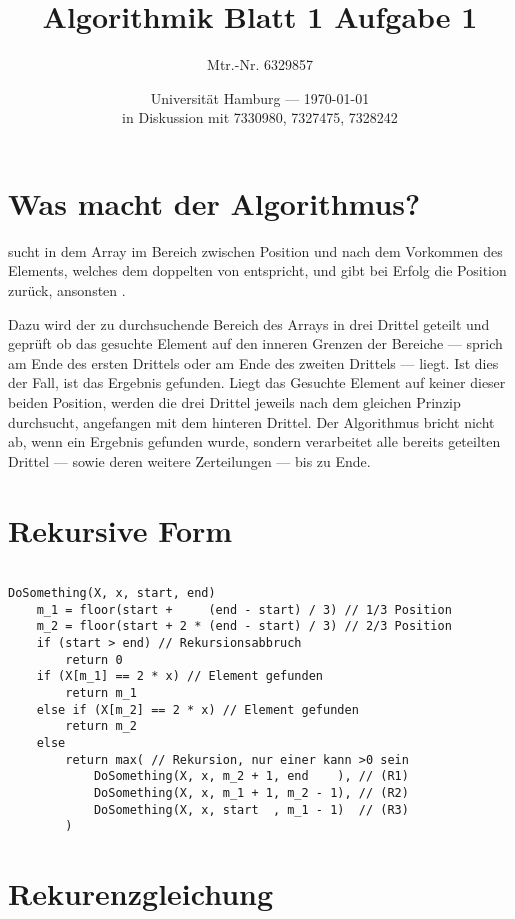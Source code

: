 \documentclass[parskip=half,a4paper]{scrartcl}
\title{Algorithmik Blatt 1 Aufgabe 1}
\author{Mtr.-Nr. 6329857}
\date{Universität Hamburg --- \today \\ in Diskussion mit 7330980, 7327475, 7328242}
\begin{document}
\maketitle %

\section*{Was macht der Algorithmus?}

 sucht in dem Array  im Bereich zwischen Position
 und  nach dem Vorkommen des Elements, welches dem doppelten von 
entspricht, und gibt bei Erfolg die Position zurück, ansonsten .

Dazu wird der zu durchsuchende Bereich des Arrays in drei Drittel geteilt und geprüft ob das gesuchte Element auf den inneren Grenzen der Bereiche --- sprich am Ende des ersten Drittels oder am Ende des zweiten Drittels --- liegt. Ist dies der Fall, ist das Ergebnis gefunden. Liegt das Gesuchte Element auf keiner dieser beiden Position, werden die drei Drittel jeweils nach dem gleichen Prinzip durchsucht, angefangen mit dem hinteren Drittel. Der Algorithmus bricht nicht ab, wenn ein Ergebnis gefunden wurde, sondern verarbeitet alle bereits geteilten Drittel --- sowie deren weitere Zerteilungen --- bis zu Ende.

\section*{Rekursive Form}

\begin{verbatim}

DoSomething(X, x, start, end)
    m_1 = floor(start +     (end - start) / 3) // 1/3 Position
    m_2 = floor(start + 2 * (end - start) / 3) // 2/3 Position
    if (start > end) // Rekursionsabbruch
        return 0
    if (X[m_1] == 2 * x) // Element gefunden
        return m_1
    else if (X[m_2] == 2 * x) // Element gefunden
        return m_2
    else
        return max( // Rekursion, nur einer kann >0 sein
            DoSomething(X, x, m_2 + 1, end    ), // (R1)
            DoSomething(X, x, m_1 + 1, m_2 - 1), // (R2)
            DoSomething(X, x, start  , m_1 - 1)  // (R3)
        )

\end{verbatim}

\section*{Rekurenzgleichung}
\end{document}
